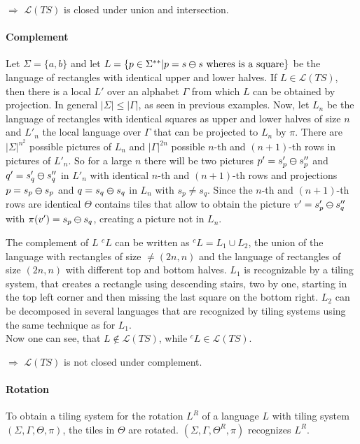 \documentclass{article}
\begin{document}
$\Rightarrow$ $\mathcal{L}(TS)$ is closed under union and intersection.

\paragraph{Complement} Let $\Sigma = \{a,b\}$ and let $L = \{p \in \Sigma^{**} | p = s\varominus s \textrm{ wheres is a square}\}$ be the language of rectangles with identical upper and lower halves. If $L \in \mathcal{L}(TS)$, then there is a local $L'$ over an alphabet $\Gamma$ from which $L$ can be obtained by projection. In general $|\Sigma| \leq |\Gamma|$, as seen in previous examples. Now, let $L_n$ be the language of rectangles with identical squares as upper and lower halves of size $n$ and $L'_n$ the local language over $\Gamma$ that can be projected to $L_n$ by $\pi$. There are $|\Sigma|^{n^2}$ possible pictures of $L_n$ and $|\Gamma|^{2n}$ possible $n$-th and $(n+1)$-th rows in pictures of $L'_n$. So for a large $n$ there will be two pictures $p' = s_p' \varominus s_p''$ and $q' = s_q' \varominus s_q''$ in $L'_n$ with identical $n$-th and $(n+1)$-th rows and projections $p = s_p \varominus s_p$ and $q = s_q \varominus s_q$ in $L_n$ with $s_p \neq s_q$. Since the $n$-th and $(n+1)$-th rows are identical $\Theta$ contains tiles that allow to obtain the picture $v' = s_p' \varominus s_q''$ with $\pi(v') = s_p \varominus s_q$, creating a picture not in $L_n$. 


The complement of $L$ $^cL$ can be written as $^cL = L_1 \cup L_2$, the union of the language with rectangles of size $\neq (2n,n)$ and the language of rectangles of size $(2n,n)$ with different top and bottom halves. $L_1$ is recognizable by a tiling system, that creates a rectangle using descending stairs, two by one, starting in the top left corner and then missing the last square on the bottom right. $L_2$ can be decomposed in several languages that are recognized by tiling systems using the same technique as for $L_1$.\\
Now one can see, that $L \notin \mathcal{L}(TS)$, while $^cL \in \mathcal{L}(TS)$.


$\Rightarrow$ $\mathcal{L}(TS)$ is not closed under complement.

\paragraph{Rotation} To obtain a tiling system for the rotation $L^R$ of a language $L$ with tiling system $(\Sigma, \Gamma, \Theta, \pi)$, the tiles in $\Theta$ are rotated. $(\Sigma, \Gamma, \Theta^R, \pi)$ recognizes $L^R$.
\end{document}
